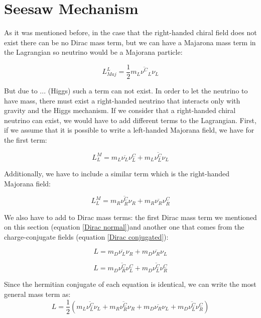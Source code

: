 


\section{Seesaw Mechanism}
As it was mentioned before, in the case that the right-handed chiral field does not exist there can be no Dirac mass term, but we can have a Majarona mass term in the 
Lagrangian so neutrino would be a Majorana particle:

\begin{equation}
L_{Maj}^{L} = \frac{1}{2} m_L \overline{\nu^{C}}_L \nu_L
\end{equation}

But due to ... (Higgs) such a term can not exist. In order to let the neutrino to have mass, there must exist a right-handed neutrino that interacts only with gravity 
and the Higgs mechanism.%
If we consider that a right-handed chiral neutrino can exist, we would have to add different terms to the Lagrangian. First, if 
we assume that it is possible to write a left-handed Majorana field, we have for the first term:

\begin{equation}
L_L^{M} = m_L \overline{\nu_L} \nu_{L}^C + m_L \overline{\nu_L^C} \nu_L
\end{equation}

Additionally, we have to include a similar term which is the right-handed Majorana field:

\begin{equation}
L_L^{M} = m_R \overline{\nu_R^C} \nu_{R} + m_R \overline{\nu_R} \nu_R^C
\end{equation}

We also have to add to Dirac mass terms: the first Dirac mass term we mentioned on this section (equation \ref{Dirac normal})and another one that comes from the 
charge-conjugate fields (equation \ref{Dirac conjugated}):

\begin{equation}\label{Dirac normal}
L = m_D \overline{\nu_L}\nu_R + m_D \overline{\nu_R}\nu_L
\end{equation} 

\begin{equation}\label{Dirac conjugated}
L = m_D \overline{\nu_R^C} \nu_L^C + m_D \overline{\nu_L^C}\nu_R^C
\end{equation} 

Since the hermitian conjugate of each equation is identical, we can write the most general mass term as:
\begin{equation}
L = \frac{1}{2} \left( m_L \overline{\nu_L^C} \nu_L + m_R \overline{\nu_R^C} \nu_{R} + m_D \overline{\nu_R}\nu_L + m_D \overline{\nu_L^C}\nu_R^C   \right)
\end{equation}

